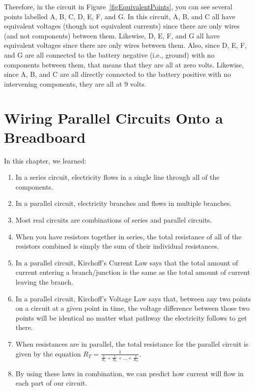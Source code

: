 Therefore, in the circuit in Figure~\ref{figEquivalentPoints}, you can see several points labelled A, B, C, D, E, F, and G.
In this circuit, A, B, and C all have equivalent voltages (though not equivalent currents) since there are only wires (and not components) between them.
Likewise, D, E, F, and G all have equivalent voltages since there are only wires between them.  
Also, since D, E, F, and G are all connected to the battery negative (i.e., ground) with no components between them, that means that they are all at zero volts.
Likewise, since A, B, and C are all directly connected to the battery positive with no intervening components, they are all at 9 volts.


\section{Wiring Parallel Circuits Onto a Breadboard}

\reviewsection

In this chapter, we learned:
\begin{enumerate}
\item In a series circuit, electricity flows in a single line through all of the components.
\item In a parallel circuit, electricity branches and flows in multiple branches.
\item Most real circuits are combinations of series and parallel circuits.
\item When you have resistors together in series, the total resistance of all of the resistors combined is simply the sum of their individual resistances.
\item In a parallel circuit, Kirchoff's Current Law says that the total amount of current entering a branch/junction is the same as the total amount of current leaving the branch.
\item In a parallel circuit, Kirchoff's Voltage Law says that, between any two points on a circuit at a given point in time, the voltage difference between those two points will be identical no matter what pathway the electricity follows to get there.
\item When resistances are in parallel, the total resistance for the parallel circuit is given by the equation $R_T = \frac{1}{\frac{1}{R_1} + \frac{1}{R_2} + \ldots + \frac{1}{R_N}}$.
\item By using these laws in combination, we can predict how current will flow in each part of our circuit.
\end{enumerate}

